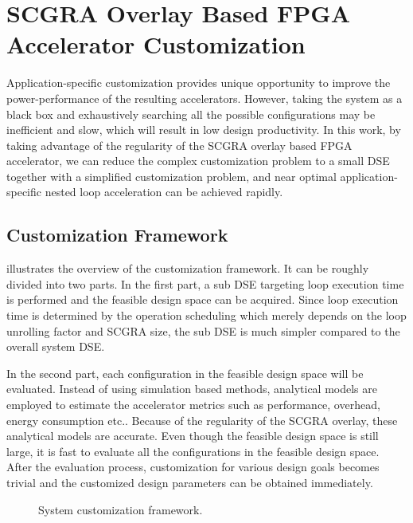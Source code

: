 \section{SCGRA Overlay Based FPGA Accelerator Customization} \label{sec:customization-method}
Application-specific customization provides unique opportunity to improve 
the power-performance of the resulting accelerators. However, 
taking the system as a black box and exhaustively searching all the 
possible configurations may be inefficient and slow, which will 
result in low design productivity. In this work, by taking advantage 
of the regularity of the SCGRA overlay based FPGA accelerator, we 
can reduce the complex customization problem to a small DSE together with 
a simplified customization problem, and near optimal application-specific 
nested loop acceleration can be achieved rapidly.

\subsection{Customization Framework}
 illustrates the overview of the 
customization framework. It can be roughly divided into two 
parts. In the first part, a sub DSE targeting loop execution time 
is performed and the feasible design space can be acquired. Since loop 
execution time is determined by the operation scheduling 
which merely depends on the loop unrolling factor and SCGRA size, the 
sub DSE is much simpler compared to the overall system DSE. 

In the second part, each configuration 
in the feasible design space will be evaluated. Instead of using simulation 
based methods, analytical models are employed to estimate the accelerator 
metrics such as performance, overhead, energy consumption etc.. 
Because of the regularity of the SCGRA overlay, these analytical models are accurate. 
Even though the feasible design space is still large, it is fast to evaluate 
all the configurations in the feasible design space. After the evaluation process, 
customization for various design goals becomes trivial and the customized 
design parameters can be obtained immediately.

\begin{figure}[t]
\caption{System customization framework.}
\label{fig:customization-framework}
\end{figure}


